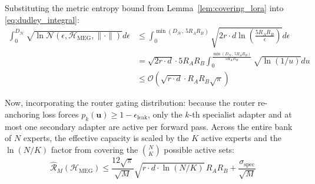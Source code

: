 \documentclass{article}
\theoremstyle{definition}
\begin{document}
Substituting the metric entropy bound from Lemma~\ref{lem:covering_lora} into \cref{eq:dudley_integral}:
\begin{align}
\int_0^{D_{\mathcal{H}}} \sqrt{\ln \mathcal{N}(\epsilon, \mathcal{H}_{\text{MEG}}, \|\cdot\|)} d\epsilon &\le \int_0^{\min(D_{\mathcal{H}},\, 5 R_A R_B)} \sqrt{2 r \cdot d \ln\left(\frac{5 R_A R_B}{\epsilon}\right)} d\epsilon \\
&= \sqrt{2 r \cdot d} \cdot 5 R_A R_B \int_0^{\frac{\min(D_{\mathcal{H}},\, 5 R_A R_B)}{5 R_A R_B}} \sqrt{\ln(1/u)} du \\
&\le \mathcal{O}\left( \sqrt{r \cdot d} \cdot R_A R_B \sqrt{\pi} \right)
\end{align}

Now, incorporating the router gating distribution: because the router re-anchoring loss forces $p_k(\mathbf{u}) \ge 1 - \epsilon_{\text{leak}}$, only the $k$-th specialist adapter and at most one secondary adapter are active per forward pass. Across the entire bank of $N$ experts, the effective capacity is scaled by the $K$ active experts and the $\ln(N/K)$ factor from covering the $\binom{N}{K}$ possible active sets:
\begin{equation}
\hat{\mathcal{R}}_M(\mathcal{H}_{\text{MEG}}) \le \frac{12 \sqrt{\pi}}{\sqrt{M}} \sqrt{r \cdot d \cdot \ln(N/K)}\, R_A R_B + \frac{\sigma_{\text{spec}}}{\sqrt{M}}
\end{equation}
\end{document}

